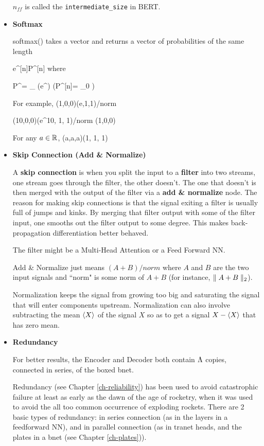 \begin{itemize}
$n_{ff}$ is called the {\tt intermediate\_size}
in BERT.

\item {\bf Softmax}

softmax() takes a vector and returns
a vector of probabilities of the same length

\beq
e^{[n]}\rarrow P^{[n]}
\eeq
where

\beq
P^\alp=
{\sum_{\alp\in[n]} \exp(e^\alp )}
\;\;
\left(P^{[n]}=
{_0}
\right)
\eeq

For example,
\beq
(1,0,0)\rarrow (e,1,1)/norm
\eeq

\beq
(10,0,0)\rarrow (e^{10}, 1, 1)/norm \approx (1,0,0)
\eeq

For any $a\in{ \mathbb{R}}$,
\beq
(a,a,a)\rarrow {}(1, 1, 1)
\eeq


\item {\bf Skip Connection (Add \& Normalize)}

A {\bf skip connection} is when you split the
input to a {\bf filter} into two streams, one stream goes through
the filter, the other doesn't. The one that doesn't
is then merged with the output of the filter via a {\bf add \& normalize} node. The reason for making skip connections
is that the signal exiting a filter is usually full of
jumps and kinks. By merging that filter output
with some  of the filter input, one smooths out the filter output
to some degree. This makes back-propagation differentiation
better behaved.

The filter might be a Multi-Head Attention or a Feed Forward NN.

Add \& Normalize just means $(A + B)/norm$ where $A$ and $B$
are the two input signals and ``norm" is some norm of $A+B$ (for
instance, $\parallel A+B\parallel_2$).

Normalization keeps the signal from growing too big and saturating the signal that will enter components upstream.
Normalization can also involve subtracting the mean $\left\langle X\right\rangle$ of the signal $X$  so as to get a signal $X-\left\langle X\right\rangle$  that has zero mean.

\item {\bf Redundancy}

For better results, the Encoder
and Decoder both contain $\Lambda$ 
copies, connected in series, of the boxed bnet.

Redundancy (see Chapter \ref{ch-reliability}) has been used to
avoid catastrophic failure at least as early as
the dawn of the age
of rocketry, when it
was used to avoid the all too common 
occurrence of exploding rockets.
There are 2 basic types of
redundancy: in series connection (as in the layers in a feedforward NN),
and in parallel connection (as in  
tranet heads, and the plates in a bnet (see Chapter \ref{ch-plates})).


\end{itemize}
